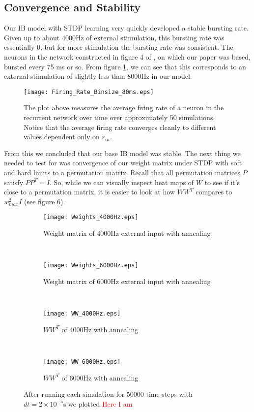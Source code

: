 \subsection{Convergence and Stability}

Our IB model with STDP learning very quickly developed a stable bursting rate. Given up to about 4000Hz of external stimulation, this bursting rate was essentially 0, but for more stimulation the bursting rate was consistent. The neurons in the network constructed in figure 4 of \cite{Fiete}, on which our paper was based, bursted every 75 ms or so. From figure \ref{FR}, we can see that this corresponds to an external stimulation of slightly less than 8000Hz in our model.

\begin{figure}[H]
\centering
\texttt{[image: Firing\_Rate\_Binsize\_80ms.eps]}
\caption{The plot above measures the average firing rate of a neuron in the recurrent network over time over approximately 50 simulations. Notice that the average firing rate converges cleanly to different values dependent only on \(r_{in}\).}
\label{FR}
\end{figure}

From this we concluded that our base IB model was stable. The next thing we needed to test for was convergence of our weight matrix under STDP with soft and hard limits to a permutation matrix. Recall that all permutation matrices \(P\) satisfy \(PP^T = I\). So, while we can visually inspect heat maps of \(W\) to see if it's close to a permutation matrix, it is easier to look at how \(WW^T\) compares to \(w_{max}^2I\) (see figure \ref{Weights}).

\begin{figure}[H]
\centering
\begin{subfigure}[b]{0.49\textwidth}
\texttt{[image: Weights\_4000Hz.eps]}
\caption{Weight matrix of 4000Hz external input with annealing}
\label{Weights: 4000Hz, basic}
\end{subfigure}
\,
\begin{subfigure}[b]{0.49\textwidth}
\texttt{[image: Weights\_6000Hz.eps]}
\caption{Weight matrix of 6000Hz external input with annealing}
\label{Weights: 6000Hz, basic}
\end{subfigure}
\\
\begin{subfigure}[b]{0.49\textwidth}
\texttt{[image: WW\_4000Hz.eps]}
\caption{\(WW^T\) of 4000Hz with annealing}
\label{Weights: 4000Hz, product}
\end{subfigure}
\,
\begin{subfigure}[b]{0.49\textwidth}
\texttt{[image: WW\_6000Hz.eps]}
\caption{\(WW^T\) of 6000Hz with annealing}
\label{Weights: 6000Hz, product}
\end{subfigure}
\caption{After running each simulation for 50000 time steps with \(dt = 2\times 10^{-5}\)s we plotted \textcolor{red}{Here I am}}
\label{Weights}
\end{figure}

